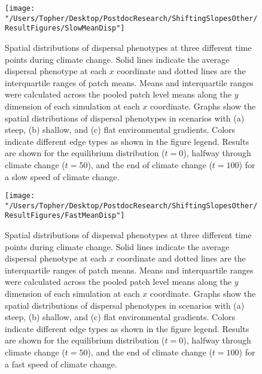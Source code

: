 \documentclass[11pt]{article}
\begin{document}
\clearpage

\begin{figure}[h!]
\texttt{[image: "/Users/Topher/Desktop/PostdocResearch/ShiftingSlopesOther/ResultFigures/SlowMeanDisp"]}
\caption{Spatial distributions of dispersal phenotypes at three different time points during climate change. Solid lines indicate the average dispersal phenotype at each $x$ coordinate and dotted lines are the interquartile ranges of patch means. Means and interquartile ranges were calculated across the pooled patch level means along the $y$ dimension of each simulation at each $x$ coordinate. Graphs show the spatial distributions of dispersal phenotypes in scenarios with (a) steep, (b) shallow, and (c) flat environmental gradients. Colors indicate different edge types as shown in the figure legend. Results are shown for the equilibrium distribution ($t = 0$), halfway through climate change ($t = 50$), and the end of climate change ($t = 100$) for a slow speed of climate change.}
\label{Fig:MeanDispSlow}
\end{figure}

\clearpage

\begin{figure}[h!]
\texttt{[image: "/Users/Topher/Desktop/PostdocResearch/ShiftingSlopesOther/ResultFigures/FastMeanDisp"]}
\caption{Spatial distributions of dispersal phenotypes at three different time points during climate change. Solid lines indicate the average dispersal phenotype at each $x$ coordinate and dotted lines are the interquartile ranges of patch means. Means and interquartile ranges were calculated across the pooled patch level means along the $y$ dimension of each simulation at each $x$ coordinate. Graphs show the spatial distributions of dispersal phenotypes in scenarios with (a) steep, (b) shallow, and (c) flat environmental gradients. Colors indicate different edge types as shown in the figure legend. Results are shown for the equilibrium distribution ($t = 0$), halfway through climate change ($t = 50$), and the end of climate change ($t = 100$) for a fast speed of climate change.}
\label{Fig:MeanDispFast}
\end{figure}

\clearpage
\end{document}
